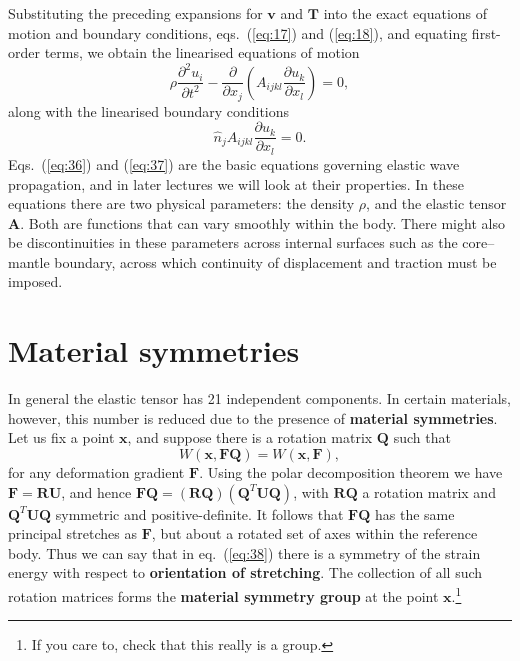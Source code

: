 Substituting the preceding expansions for $\mathbf{v}$ and $\mathbf{T}$ into the exact equations of motion and boundary conditions, 
eqs.~(\ref{eq:17}) and (\ref{eq:18}), and equating first-order terms, we obtain the linearised equations of motion
\begin{equation}
\rho\frac{\partial^2 u_{i}}{\partial t^2} - \frac{\partial}{\partial x_{j}}\left(A_{ijkl}\frac{\partial u_{k}}{\partial x_{l}}\right) = 0,
\label{eq:36}
\end{equation}
along with the linearised boundary conditions
\begin{equation}
\hat{n}_{j}A_{ijkl}\frac{\partial u_{k}}{\partial x_{l}} = 0.
\label{eq:37}
\end{equation}
Eqs.~(\ref{eq:36}) and (\ref{eq:37}) are the basic equations governing elastic wave propagation, and in later lectures we will look at their properties. In these equations there are two physical parameters: the density $\rho$, and the elastic tensor $\mathbf{A}$. Both are functions that can vary smoothly within the body. There might also be discontinuities in these parameters across internal surfaces such as the core--mantle boundary, across which continuity of displacement and traction must be imposed.

\section*{Material symmetries}

In general the elastic tensor has 21 independent components. In certain materials, however, this number is reduced due to 
the presence of \textbf{material symmetries}. Let us fix a point $\mathbf{x}$, and suppose there is a rotation matrix $\mathbf{Q}$ such that
\begin{equation}
W(\mathbf{x}, \mathbf{F}\mathbf{Q}) = W(\mathbf{x}, \mathbf{F}),
\label{eq:38}
\end{equation}
for any deformation gradient $\mathbf{F}$. Using the polar decomposition theorem we have $\mathbf{F} = \mathbf{R}\mathbf{U}$, and hence 
 $\mathbf{F}\mathbf{Q} = (\mathbf{R}\mathbf{Q})(\mathbf{Q}^{T}\mathbf{U}\mathbf{Q})$, with $\mathbf{R}\mathbf{Q}$ a rotation matrix 
  and $\mathbf{Q}^{T}\mathbf{U}\mathbf{Q}$ symmetric and positive-definite. It follows that $\mathbf{F}\mathbf{Q}$ has the same principal stretches as $\mathbf{F}$,
   but about a rotated set of axes within the reference body. Thus we can say that in eq.~(\ref{eq:38}) there is a symmetry of the strain energy with 
   respect to \textbf{orientation of stretching}. The collection of all such rotation matrices forms the \textbf{material symmetry 
   group} at the point $\mathbf{x}$.\footnote{If you care to, check that this really is a group.}

